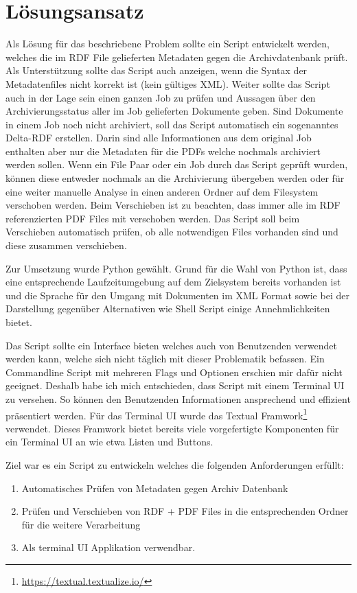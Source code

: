 \documentclass[a4paper,oneside, 12pt]{report}
\begin{document}
 \section{Lösungsansatz}
Als Lösung für das beschriebene Problem sollte ein Script entwickelt werden, welches die im \ac{RDF} File gelieferten Metadaten gegen die Archivdatenbank prüft. Als Unterstützung sollte das Script auch anzeigen, wenn die Syntax der Metadatenfiles nicht korrekt ist (kein gültiges XML). Weiter sollte das Script auch in der Lage sein einen ganzen Job zu prüfen und Aussagen über den Archivierungsstatus aller im Job gelieferten Dokumente geben. Sind Dokumente in einem Job noch nicht archiviert, soll das Script automatisch ein sogenanntes Delta-RDF erstellen. Darin sind alle Informationen aus dem original Job enthalten aber nur die Metadaten für die PDFs welche nochmals archiviert werden sollen.
Wenn ein File Paar oder ein Job durch das Script geprüft wurden, können diese entweder nochmals an die Archivierung übergeben werden oder für eine weiter manuelle Analyse in einen anderen Ordner auf dem Filesystem verschoben werden. Beim Verschieben ist zu beachten, dass immer alle im RDF referenzierten PDF Files mit verschoben werden. Das Script soll beim Verschieben automatisch prüfen, ob alle notwendigen Files vorhanden sind und diese zusammen verschieben.

Zur Umsetzung wurde Python gewählt. Grund für die Wahl von Python ist, dass eine entsprechende Laufzeitumgebung auf dem Zielsystem bereits vorhanden ist und die Sprache für den Umgang mit Dokumenten im XML Format sowie bei der Darstellung gegenüber Alternativen wie Shell Script einige Annehmlichkeiten bietet.

Das Script sollte ein Interface bieten welches auch von Benutzenden verwendet werden kann, welche sich nicht täglich mit dieser Problematik befassen. Ein Commandline Script mit mehreren Flags und Optionen erschien mir dafür nicht geeignet. Deshalb habe ich mich entschieden, dass Script mit einem Terminal UI zu versehen. So können den Benutzenden Informationen ansprechend und effizient präsentiert werden. Für das Terminal UI wurde das Textual Framwork\footnote{\url{https://textual.textualize.io/}}  verwendet. Dieses Framwork bietet bereits viele vorgefertigte Komponenten für ein Terminal UI an wie etwa Listen und Buttons.

Ziel war es ein Script zu entwickeln welches die folgenden Anforderungen erfüllt:

\begin{enumerate}
  \item Automatisches Prüfen von Metadaten gegen Archiv Datenbank
  \item Prüfen und Verschieben von RDF + PDF Files in die entsprechenden Ordner für die weitere Verarbeitung
  \item Als terminal UI Applikation verwendbar.
\end{enumerate}
\end{document}
